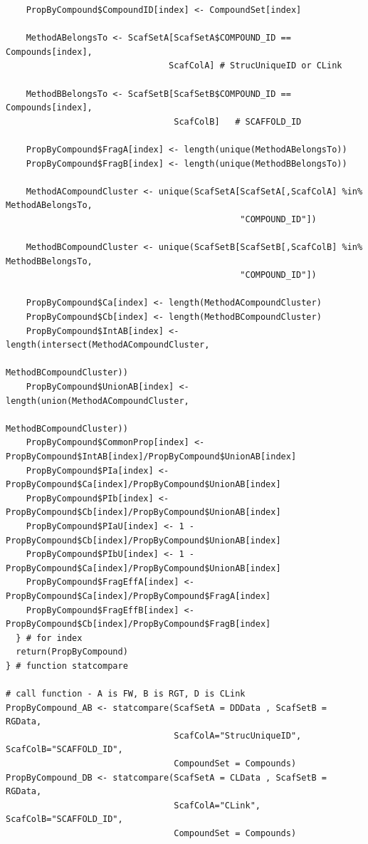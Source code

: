 \documentclass[11pt,letterpaper]{article}
\begin{document}
{\begin{lstlisting}
    PropByCompound$CompoundID[index] <- CompoundSet[index]
  
    MethodABelongsTo <- ScafSetA[ScafSetA$COMPOUND_ID == Compounds[index],
                                ScafColA] # StrucUniqueID or CLink
    
    MethodBBelongsTo <- ScafSetB[ScafSetB$COMPOUND_ID == Compounds[index],
                                 ScafColB]   # SCAFFOLD_ID
    
    PropByCompound$FragA[index] <- length(unique(MethodABelongsTo))
    PropByCompound$FragB[index] <- length(unique(MethodBBelongsTo))
    
    MethodACompoundCluster <- unique(ScafSetA[ScafSetA[,ScafColA] %in% MethodABelongsTo,
                                              "COMPOUND_ID"])
  
    MethodBCompoundCluster <- unique(ScafSetB[ScafSetB[,ScafColB] %in% MethodBBelongsTo,
                                              "COMPOUND_ID"])
    
    PropByCompound$Ca[index] <- length(MethodACompoundCluster)
    PropByCompound$Cb[index] <- length(MethodBCompoundCluster)
    PropByCompound$IntAB[index] <- length(intersect(MethodACompoundCluster,
                                                    MethodBCompoundCluster))
    PropByCompound$UnionAB[index] <- length(union(MethodACompoundCluster,
                                                  MethodBCompoundCluster))
    PropByCompound$CommonProp[index] <- PropByCompound$IntAB[index]/PropByCompound$UnionAB[index]
    PropByCompound$PIa[index] <- PropByCompound$Ca[index]/PropByCompound$UnionAB[index]
    PropByCompound$PIb[index] <- PropByCompound$Cb[index]/PropByCompound$UnionAB[index]
    PropByCompound$PIaU[index] <- 1 - PropByCompound$Cb[index]/PropByCompound$UnionAB[index]
    PropByCompound$PIbU[index] <- 1 - PropByCompound$Ca[index]/PropByCompound$UnionAB[index]
    PropByCompound$FragEffA[index] <- PropByCompound$Ca[index]/PropByCompound$FragA[index]
    PropByCompound$FragEffB[index] <- PropByCompound$Cb[index]/PropByCompound$FragB[index]
  } # for index
  return(PropByCompound) 
} # function statcompare

# call function - A is FW, B is RGT, D is CLink
PropByCompound_AB <- statcompare(ScafSetA = DDData , ScafSetB = RGData, 
                                 ScafColA="StrucUniqueID", ScafColB="SCAFFOLD_ID", 
                                 CompoundSet = Compounds)
PropByCompound_DB <- statcompare(ScafSetA = CLData , ScafSetB = RGData, 
                                 ScafColA="CLink", ScafColB="SCAFFOLD_ID", 
                                 CompoundSet = Compounds)


\end{lstlisting}}
\end{document}
